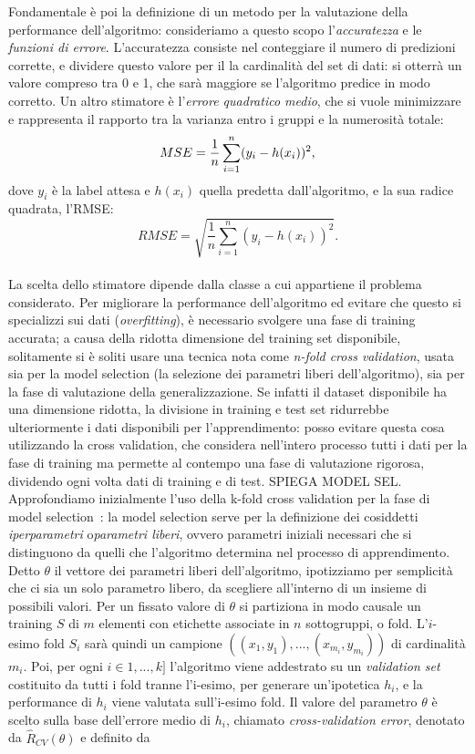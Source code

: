 \documentclass[oneside, openany]{book}
\begin{document}
		Fondamentale è poi la definizione di un metodo per la valutazione della performance dell'algoritmo: consideriamo a questo scopo l'\textit{accuratezza} e le \textit{funzioni di errore}. L'accuratezza consiste nel conteggiare il numero di predizioni corrette, e dividere questo valore per il la cardinalità del set di dati: si otterrà un valore compreso tra 0 e 1, che sarà maggiore se l'algoritmo predice in modo corretto. Un altro stimatore è l'\textit{errore quadratico medio}, che si vuole minimizzare e rappresenta il rapporto tra la varianza entro i gruppi e la numerosità totale:\\
		\[
		MSE={1\over n}\sum_{i=1}^n (y_i-h(x_i))^2\text{,}
		\]
		dove $y_i$ è la label attesa e $h(x_i)$ quella predetta dall'algoritmo, e la sua radice quadrata, l'RMSE:\\
		\[
		RMSE = \sqrt{\frac{1}{n}\sum_{i=1}^{n}(y_{i} - h(x_{i}))^{2}}\text{.}
		\]\\
		La scelta dello stimatore dipende dalla classe a cui appartiene il problema considerato.
		Per migliorare la performance dell'algoritmo ed evitare che questo si specializzi sui dati (\textit{overfitting}), è necessario svolgere una fase di training accurata; a causa della ridotta dimensione del training set disponibile, solitamente si è soliti usare una tecnica nota come \textit{n-fold cross validation}, usata sia per la model selection (la selezione dei parametri liberi dell'algoritmo), sia per la fase di valutazione della generalizzazione. Se infatti il dataset disponibile ha una dimensione ridotta, la divisione in training e test set ridurrebbe ulteriormente i dati disponibili per l'apprendimento: posso evitare questa cosa utilizzando la cross validation, che considera nell'intero processo tutti i dati per la fase di training ma permette al contempo una fase di valutazione rigorosa, dividendo ogni volta dati di training e di test.
		SPIEGA MODEL SEL.
		Approfondiamo inizialmente l'uso della k-fold cross validation per la fase di model selection~\cite{bib:cv}: la model selection serve per la definizione dei cosiddetti \textit{iperparametri} o\textit{parametri liberi}, ovvero parametri iniziali necessari che si distinguono da quelli che l'algoritmo determina nel processo di apprendimento. Detto $\theta$ il vettore dei parametri liberi dell'algoritmo, ipotizziamo per semplicità che ci sia un solo parametro libero, da scegliere all'interno di un insieme di possibili valori. Per un fissato valore di $\theta$ si partiziona in modo causale un training $S$ di $m$ elementi con etichette associate in $n$ sottogruppi, o fold. L'$i$-esimo fold $S_i$ sarà quindi un campione $((x_{1}, y_{1}),...,(x_{m_i},y_{m_i}))$ di cardinalità $m_i$. Poi, per ogni $i\in{1, ..., k}]$ l'algoritmo viene addestrato su un \textit{validation set} costituito da tutti i fold tranne l'i-esimo, per generare un'ipotetica $h_i$, e la performance di $h_i$ viene valutata sull'i-esimo fold. Il valore del parametro $\theta$ è scelto sulla base dell'errore medio di $h_i$, chiamato \textit{cross-validation error}, denotato da $\widehat{R}_{CV}(\theta)$ e definito da
\end{document}
